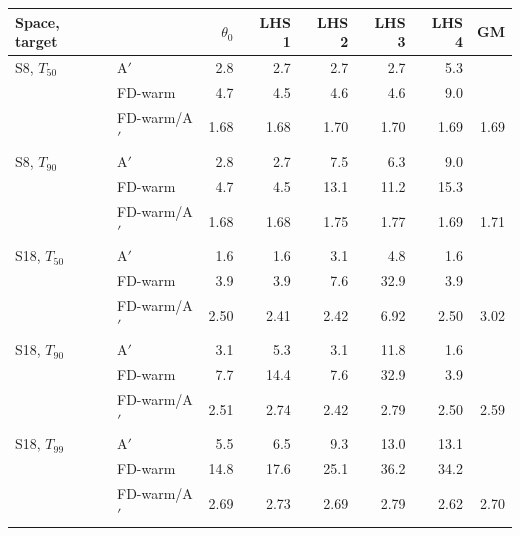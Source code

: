 \begin{tabular}{llrrrrrr}\toprule
Space, target & & $\theta_0$ & LHS 1 & LHS 2 & LHS 3 & LHS 4 & GM\\\midrule
S8, $T_{50}$ & A$'$ & 2.8 & 2.7 & 2.7 & 2.7 & 5.3 & \\
 & FD-warm & 4.7 & 4.5 & 4.6 & 4.6 & 9.0 & \\
 & FD-warm/A$'$ & 1.68 & 1.68 & 1.70 & 1.70 & 1.69 & 1.69\\
\addlinespace
S8, $T_{90}$ & A$'$ & 2.8 & 2.7 & 7.5 & 6.3 & 9.0 & \\
 & FD-warm & 4.7 & 4.5 & 13.1 & 11.2 & 15.3 & \\
 & FD-warm/A$'$ & 1.68 & 1.68 & 1.75 & 1.77 & 1.69 & 1.71\\
\addlinespace
S18, $T_{50}$ & A$'$ & 1.6 & 1.6 & 3.1 & 4.8 & 1.6 & \\
 & FD-warm & 3.9 & 3.9 & 7.6 & 32.9 & 3.9 & \\
 & FD-warm/A$'$ & 2.50 & 2.41 & 2.42 & 6.92 & 2.50 & 3.02\\
\addlinespace
S18, $T_{90}$ & A$'$ & 3.1 & 5.3 & 3.1 & 11.8 & 1.6 & \\
 & FD-warm & 7.7 & 14.4 & 7.6 & 32.9 & 3.9 & \\
 & FD-warm/A$'$ & 2.51 & 2.74 & 2.42 & 2.79 & 2.50 & 2.59\\
\addlinespace
S18, $T_{99}$ & A$'$ & 5.5 & 6.5 & 9.3 & 13.0 & 13.1 & \\
 & FD-warm & 14.8 & 17.6 & 25.1 & 36.2 & 34.2 & \\
 & FD-warm/A$'$ & 2.69 & 2.73 & 2.69 & 2.79 & 2.62 & 2.70\\
\bottomrule\end{tabular}
